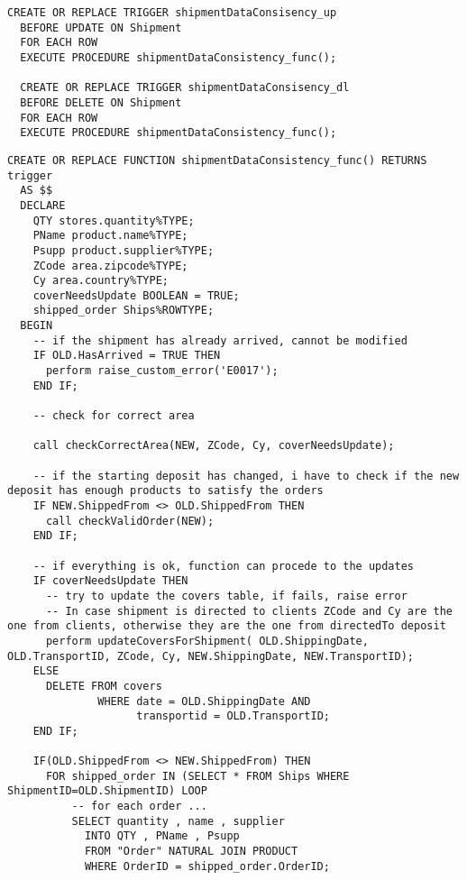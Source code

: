 \begin{lstlisting}[caption={Trigger per \textbf{UPDATE/DELETE ON Shipment}}]
  CREATE OR REPLACE TRIGGER shipmentDataConsisency_up
  BEFORE UPDATE ON Shipment
  FOR EACH ROW
  EXECUTE PROCEDURE shipmentDataConsistency_func();

  CREATE OR REPLACE TRIGGER shipmentDataConsisency_dl
  BEFORE DELETE ON Shipment
  FOR EACH ROW
  EXECUTE PROCEDURE shipmentDataConsistency_func();
\end{lstlisting}
\newpage
\begin{lstlisting}[caption={Funzione completa}]
  CREATE OR REPLACE FUNCTION shipmentDataConsistency_func() RETURNS trigger
  AS $$
  DECLARE
    QTY stores.quantity%TYPE;
    PName product.name%TYPE;
    Psupp product.supplier%TYPE;
    ZCode area.zipcode%TYPE;
    Cy area.country%TYPE;
    coverNeedsUpdate BOOLEAN = TRUE;
    shipped_order Ships%ROWTYPE;
  BEGIN
    -- if the shipment has already arrived, cannot be modified
    IF OLD.HasArrived = TRUE THEN
      perform raise_custom_error('E0017');
    END IF;

    -- check for correct area

    call checkCorrectArea(NEW, ZCode, Cy, coverNeedsUpdate);
    
    -- if the starting deposit has changed, i have to check if the new deposit has enough products to satisfy the orders
    IF NEW.ShippedFrom <> OLD.ShippedFrom THEN
      call checkValidOrder(NEW);
    END IF;

    -- if everything is ok, function can procede to the updates
    IF coverNeedsUpdate THEN
      -- try to update the covers table, if fails, raise error
      -- In case shipment is directed to clients ZCode and Cy are the one from clients, otherwise they are the one from directedTo deposit
      perform updateCoversForShipment( OLD.ShippingDate, OLD.TransportID, ZCode, Cy, NEW.ShippingDate, NEW.TransportID);
    ELSE 
      DELETE FROM covers 
              WHERE date = OLD.ShippingDate AND 
                    transportid = OLD.TransportID;
    END IF;

    IF(OLD.ShippedFrom <> NEW.ShippedFrom) THEN
      FOR shipped_order IN (SELECT * FROM Ships WHERE ShipmentID=OLD.ShipmentID) LOOP
          -- for each order ...
          SELECT quantity , name , supplier 
            INTO QTY , PName , Psupp
            FROM "Order" NATURAL JOIN PRODUCT
            WHERE OrderID = shipped_order.OrderID;


\end{lstlisting}
